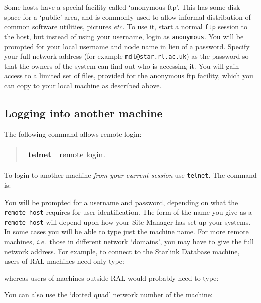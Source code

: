 \documentclass[twoside,11pt,nolof]{starlink}
\begin{document}
Some hosts have a special facility called `anonymous ftp'.
This has some disk space for a `public' area, and is commonly used to
allow informal distribution of common software utilities, pictures \emph{etc.}
To use it, start a normal \texttt{ftp} session to the host, but instead of using
your username, login as \texttt{anonymous}.
You will be prompted for your local username and node name in lieu of a
password.
Specify your full network address (for example \verb+mdl@star.rl.ac.uk+) as the
password so that the owners of the system can find out who is accessing it.
You will gain access to a limited set of files, provided for the anonymous ftp
facility, which you can copy to your local machine as described above.

\subsection{Logging into another machine}

The following command allows remote login:
\begin{quote}
\begin{tabular}{lp{67mm}}

\textbf{telnet}  & remote login.

\end{tabular}
\end{quote}
To login to another machine \emph{from your current session}\/ use \texttt{telnet}.
The command is:
\begin{terminalv}
\end{terminalv}
You will be prompted for a username and password, depending on what the
\texttt{remote\_host} requires for user identification.
The form of the name you give as a \texttt{remote\_host}
will depend upon how your Site Manager has set up your systems.
In some cases you will be able to type just the machine name.
For more remote machines, \emph{i.e.}\ those in different network `domains', you
may have to give the full network address.
For example, to connect to the Starlink Database machine, users of RAL
machines need only type:
\begin{terminalv}
\end{terminalv}
whereas users of machines outside RAL would probably need to type:
\begin{terminalv}
\end{terminalv}
You can also use the `dotted quad' network number of the machine:
\begin{terminalv}
\end{terminalv}
\end{document}
